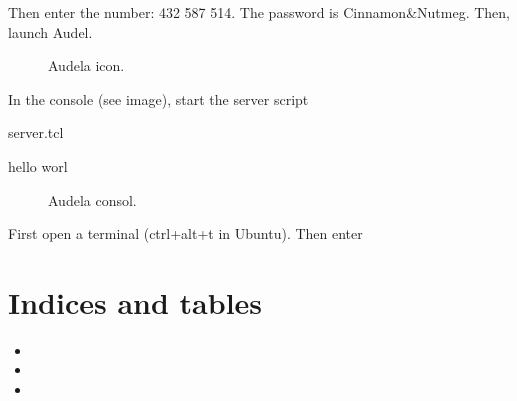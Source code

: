 \documentclass[letterpaper,10pt,english]{sphinxmanual}
\begin{document}
Then enter the number: 432 587 514. The password is Cinnamon\&Nutmeg. Then, launch Audel.

\begin{figure}[htbp]
\centering
\capstart

\noindent{}
\caption{Audela icon.}\label{\detokenize{start:id2}}\end{figure}

In the console (see image), start the server script

%
\begin{sphinxVerbatim}[commandchars=\\\{\}]
 server.tcl
\end{sphinxVerbatim}

hello worl

\begin{figure}[htbp]
\centering
\capstart

\noindent{}
\caption{Audela consol.}\label{\detokenize{start:id3}}\end{figure}

First open a terminal (ctrl+alt+t in Ubuntu). Then enter

%
\begin{sphinxVerbatim}[commandchars=\\\{\}]
     

  
\end{sphinxVerbatim}


\chapter{Indices and tables}
\label{\detokenize{index:indices-and-tables}}\begin{itemize}
\item {} 

\item {} 

\item {} 

\end{itemize}



\renewcommand{\indexname}{Index}
\printindex
\end{document}

